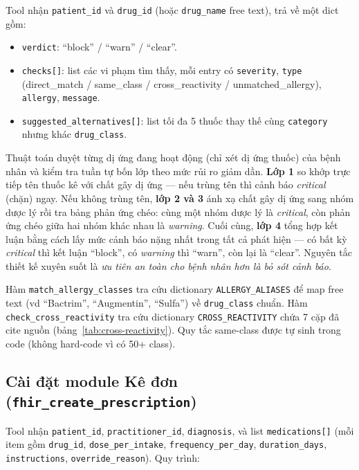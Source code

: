 \documentclass[a4paper,13pt,3p,twoside,openany]{report}
\theoremstyle{definition}
\theoremstyle{remark}
\theoremstyle{definition}
\let\ORIGsubsection\subsection
\renewcommand{\subsection}{\needspace{3\baselineskip}\ORIGsubsection}
\begin{document}
Tool nhận \texttt{patient\_id} và \texttt{drug\_id} (hoặc \texttt{drug\_name} free text), trả về một dict gồm:
\begin{itemize}
  \item \texttt{verdict}: ``block'' / ``warn'' / ``clear''.
  \item \texttt{checks[]}: list các vi phạm tìm thấy, mỗi entry có \texttt{severity}, \texttt{type} (direct\_match / same\_class / cross\_reactivity / unmatched\_allergy), \texttt{allergy}, \texttt{message}.
  \item \texttt{suggested\_alternatives[]}: list tối đa 5 thuốc thay thế cùng \texttt{category} nhưng khác \texttt{drug\_class}.
\end{itemize}

Thuật toán duyệt từng dị ứng đang hoạt động (chỉ xét dị ứng thuốc) của bệnh nhân và kiểm tra tuần tự bốn lớp theo mức rủi ro giảm dần. \textbf{Lớp 1} so khớp trực tiếp tên thuốc kê với chất gây dị ứng --- nếu trùng tên thì cảnh báo \textit{critical} (chặn) ngay. Nếu không trùng tên, \textbf{lớp 2 và 3} ánh xạ chất gây dị ứng sang nhóm dược lý rồi tra bảng phản ứng chéo: cùng một nhóm dược lý là \textit{critical}, còn phản ứng chéo giữa hai nhóm khác nhau là \textit{warning}. Cuối cùng, \textbf{lớp 4} tổng hợp kết luận bằng cách lấy mức cảnh báo nặng nhất trong tất cả phát hiện --- có bất kỳ \textit{critical} thì kết luận ``block'', có \textit{warning} thì ``warn'', còn lại là ``clear''. Nguyên tắc thiết kế xuyên suốt là \textit{ưu tiên an toàn cho bệnh nhân hơn là bỏ sót cảnh báo}.

Hàm \texttt{match\_allergy\_classes} tra cứu dictionary \texttt{ALLERGY\_ALIASES} để map free text (vd ``Bactrim'', ``Augmentin'', ``Sulfa'') về \texttt{drug\_class} chuẩn. Hàm \texttt{check\_cross\_reactivity} tra cứu dictionary \texttt{CROSS\_REACTIVITY} chứa 7 cặp đã cite nguồn (bảng~\ref{tab:cross-reactivity}). Quy tắc same-class được tự sinh trong code (không hard-code vì có 50+ class).

\subsection{Cài đặt module Kê đơn (\texttt{fhir\_create\_prescription})}

Tool nhận \texttt{patient\_id}, \texttt{practitioner\_id}, \texttt{diagnosis}, và list \texttt{medications[]} (mỗi item gồm \texttt{drug\_id}, \texttt{dose\_per\_intake}, \texttt{frequency\_per\_day}, \texttt{duration\_days}, \texttt{instructions}, \texttt{override\_reason}). Quy trình:
\end{document}
